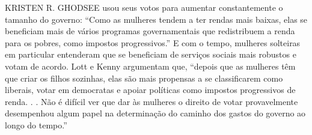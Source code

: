  \par 
KRISTEN R. GHODSEE usou seus votos para aumentar constantemente o tamanho do governo: “Como as mulheres tendem a ter rendas mais baixas, elas se beneficiam mais de vários programas governamentais que redistribuem a renda para os pobres, como impostos progressivos.” E com o tempo, mulheres solteiras em particular entenderam que se beneficiam de serviços sociais mais robustos e votam de acordo. Lott e Kenny argumentam que, “depois que as mulheres têm que criar os filhos sozinhas, elas são mais propensas a se classificarem como liberais, votar em democratas e apoiar políticas como impostos progressivos de renda. . . Não é difícil ver que dar às mulheres o direito de votar provavelmente desempenhou algum papel na determinação do caminho dos gastos do governo ao longo do tempo.”
 \par 

